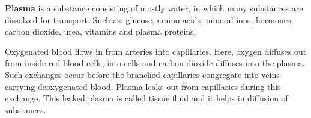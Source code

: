 \textbf{Plasma} is a substance consisting of mostly water, in which many substances are dissolved
for transport. Such as: glucose, amino acids, mineral ions, hormones, carbon dioxide, urea, vitamins
and plasma proteins.

Oxygenated blood flows in from arteries into capillaries. Here, oxygen diffuses out from inside
red blood cells, into cells and carbon dioxide diffuses into the plasma. Such exchanges occur
before the branched capillaries congregate into veins carrying deoxygenated blood. Plasma leaks
out from capillaries during this exchange. This leaked plasma is called tissue fluid and it helps
in diffusion of substances.
